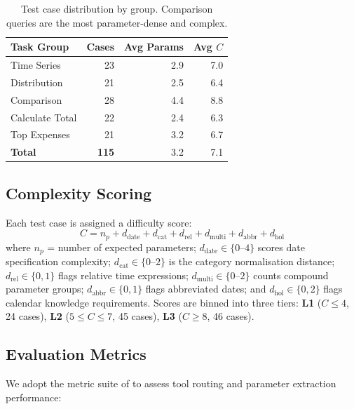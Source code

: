 \documentclass[11pt,twocolumn]{article}
\begin{document}
\begin{table}[t]
\centering
\small
\begin{tabular}{@{}lrrr@{}}
\toprule
\textbf{Task Group} & \textbf{Cases} & \textbf{Avg Params} & \textbf{Avg $C$} \\
\midrule
Time Series     & 23 & 2.9 & 7.0 \\
Distribution    & 21 & 2.5 & 6.4 \\
Comparison      & 28 & 4.4 & 8.8 \\
Calculate Total & 22 & 2.4 & 6.3 \\
Top Expenses    & 21 & 3.2 & 6.7 \\
\midrule
\textbf{Total}  & \textbf{115} & 3.2 & 7.1 \\
\bottomrule
\end{tabular}
\caption{Test case distribution by group. Comparison queries are the
most parameter-dense and complex.}
\label{tab:tc_distribution}
\end{table}

\subsection{Complexity Scoring}

Each test case is assigned a difficulty score:
\begin{equation}
C = n_p + d_{\text{date}} + d_{\text{cat}} + d_{\text{rel}} +
    d_{\text{multi}} + d_{\text{abbr}} + d_{\text{hol}}
\label{eq:complexity}
\end{equation}
where $n_p$ = number of expected parameters; $d_{\text{date}}
\in \{0\text{--}4\}$ scores date specification complexity;
$d_{\text{cat}} \in \{0\text{--}2\}$ is the category normalisation
distance; $d_{\text{rel}} \in \{0,1\}$ flags relative time
expressions; $d_{\text{multi}} \in \{0\text{--}2\}$ counts compound
parameter groups; $d_{\text{abbr}} \in \{0,1\}$ flags abbreviated
dates; and $d_{\text{hol}} \in \{0,2\}$ flags calendar knowledge
requirements.
Scores are binned into three tiers: \textbf{L1} ($C\leq4$, 24
cases), \textbf{L2} ($5\leq C\leq7$, 45 cases), \textbf{L3}
($C\geq8$, 46 cases).

\subsection{Evaluation Metrics}

We adopt the metric suite of \citet{kavathekar2025small} to assess tool routing and parameter extraction performance:
\end{document}

